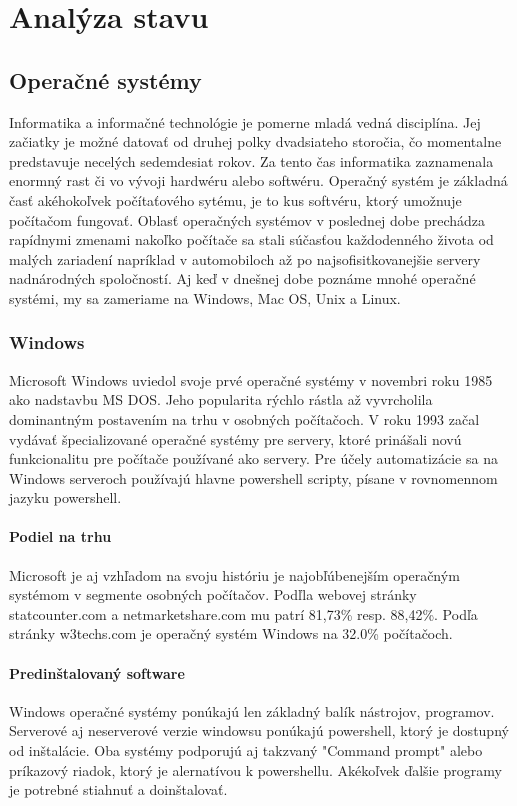 \section{Analýza stavu}
\subsection{Operačné systémy}
\indent Informatika a informačné technológie je pomerne mladá vedná disciplína. Jej začiatky je možné datovať od druhej polky dvadsiateho storočia, čo momentalne predstavuje necelých sedemdesiat rokov. Za tento čas informatika zaznamenala enormný rast či vo vývoji hardwéru alebo softwéru.  Operačný systém je základná časť akéhokoľvek počítaťového sytému, je to kus softvéru, ktorý umožnuje počítačom fungovať. Oblasť operačných systémov v poslednej dobe prechádza rapídnymi zmenami nakoľko počítače sa stali súčasťou každodenného života od malých zariadení napríklad v automobiloch až po najsofisitkovanejšie servery nadnárodných spoločností. Aj keď v dnešnej dobe poznáme mnohé operačné systémi, my sa zameriame na Windows, Mac OS, Unix a Linux.\cite{osbook}
\subsubsection{Windows}
\indent Microsoft Windows uviedol svoje prvé operačné systémy v novembri roku 1985 ako nadstavbu MS DOS. Jeho popularita rýchlo rástla až vyvrcholila dominantným postavením na trhu v osobných počítačoch. V roku 1993 začal vydávať špecializované operačné systémy pre servery, ktoré prinášali novú funkcionalitu pre počítače používané ako servery.\cite{windowsHistory} Pre účely automatizácie sa na Windows serveroch používajú hlavne powershell scripty, písane v rovnomennom jazyku powershell\cite{winAutomation}.
\paragraph{Podiel na trhu}
\indent Microsoft je aj vzhľadom na svoju históriu je najobľúbenejším operačným systémom v segmente osobných počítačov. Podľla webovej stránky statcounter.com\cite{statcounter} a netmarketshare.com\cite{netmarketshare} mu patrí 81,73\% resp.  88,42\%.
\newline
\indent Podľa stránky w3techs.com\cite{pop} je operačný systém Windows na 32.0\% počítačoch.
\paragraph{Predinštalovaný software}
\indent Windows operačné systémy ponúkajú len základný balík nástrojov, programov. Serverové aj neserverové verzie windowsu ponúkajú  powershell, ktorý je dostupný od inštalácie.  Oba systémy podporujú aj takzvaný "Command prompt" alebo príkazový riadok, ktorý je alernatívou k powershellu. Akékoľvek ďalšie programy je potrebné stiahnuť a doinštalovať.
\newline
